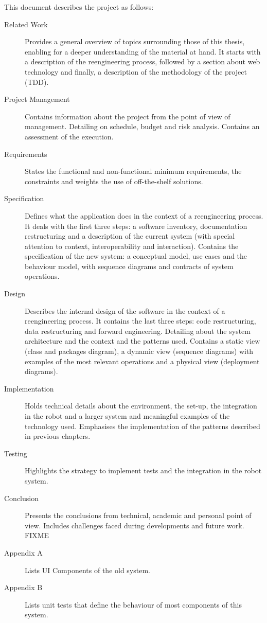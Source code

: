 This document describes the project as follows:
\begin{description}
\item[Related Work] Provides a general overview of topics surrounding those of this thesis, enabling for a deeper understanding of the material at hand.
It starts with a description of the reengineering process, followed by a section about web technology and finally, a description of the methodology of the project (\ac{TDD}).

\item[Project Management] Contains information about the project from the point of view of management. 
Detailing on schedule, budget and risk analysis. Contains an assessment of the execution.

\item[Requirements] States the functional and non-functional minimum requirements, the constraints and weights the use of off-the-shelf solutions.

\item[Specification] Defines what the application does in the context of a reengineering process. 
It deals with the first three steps: a software inventory, documentation restructuring and a description of the current system (with special attention to context, interoperability and interaction).
Contains the specification of the new system: a conceptual model, use cases and the behaviour model, with sequence diagrams and contracts of system operations. 

\item[Design] Describes the internal design of the software in the context of a reengineering process. 
It contains the last three steps: code restructuring, data restructuring and forward engineering.
Detailing about the system architecture and the context and the patterns used.
Contains a static view (class and packages diagram), a dynamic view (sequence diagrams) with examples of the most relevant operations and a physical view (deployment diagrams).

\item[Implementation] Holds technical details about the environment, the set-up, the integration in the robot and a larger system and meaningful examples of the technology used. 
Emphasises the implementation of the patterns described in previous chapters.

\item[Testing] Highlights the strategy to implement tests and the integration in the robot system.

\item[Conclusion] Presents the conclusions from technical, academic and personal point of view. 
Includes challenges faced during developments and future work. FIXME

\item[Appendix A] Lists UI Components of the old system.

\item[Appendix B] Lists unit tests that define the behaviour of most components of this system.

\end{description}